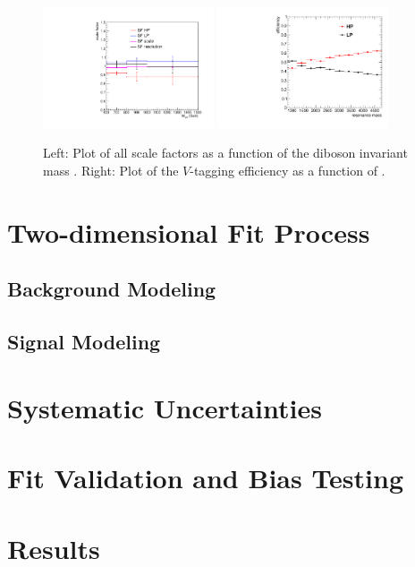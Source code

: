 \begin{figure}[htbp]
  \centering
  \includegraphics[width=0.45\textwidth]{fig/analysis/MVVDepSummary.pdf}
  \includegraphics[width=0.45\textwidth]{fig/analysis/ptDep.pdf}
  \caption{
    Left: Plot of all scale factors as a function of the diboson invariant mass \MVV.
    Right: Plot of the $V$-tagging efficiency as a function of \MVV.
  }
  \label{fig:VTag_massdep_summary}
\end{figure}

\section{Two-dimensional Fit Process}
\label{sec:2Dfit}


\subsection{Background Modeling}
\label{sec:bkg}

\subsection{Signal Modeling}
\label{sec:sig}

\section{Systematic Uncertainties}
\label{sec:uncert}

\section{Fit Validation and Bias Testing}
\label{sec:bias}

\section{Results}
\label{sec:results}
